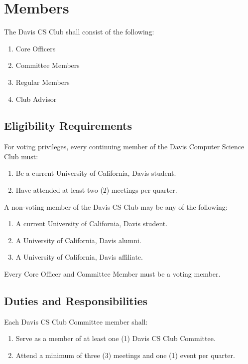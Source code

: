 \documentclass{article}
\newenvironment{li}{
\begin{enumerate}
  \setlength{\itemsep}{1pt}
  \setlength{\parskip}{0pt}
  \setlength{\parsep}{0pt}
}{\end{enumerate}}
\begin{document}

\section{Members}
The Davis CS Club shall consist of the following:
\begin{li}
\item Core Officers
\item Committee Members
\item Regular Members
\item Club Advisor
\end{li}

\subsection{Eligibility Requirements}
For voting privileges, every continuing member of the Davis Computer Science Club must:
\begin{li}
\item Be a current University of California, Davis student.
\item Have attended at least two (2) meetings per quarter.
\end{li}

\noindent A non-voting member of the Davis CS Club may be any of the following:
\begin{li}
\item A current University of California, Davis student.
\item A University of California, Davis alumni.
\item A University of California, Davis affiliate.
\end{li}

\noindent Every Core Officer and Committee Member must be a voting member.

\subsection{Duties and Responsibilities}
Each Davis CS Club Committee member shall:
\begin{li}
\item Serve as a member of at least one (1) Davis CS Club Committee.
\item Attend a minimum of three (3) meetings and one (1) event per quarter.
\end{li}
\end{document}
